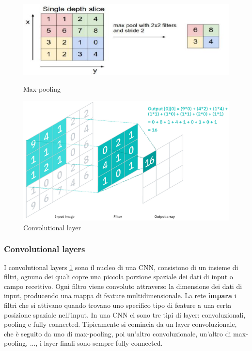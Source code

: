 \begin{figure}
	\centering
	\begin{minipage}{.5\textwidth}
		\centering
		\includegraphics[width=0.8\linewidth]{imgs/chapter11/img12}
		\caption{Max-pooling}
		\label{fig:chapter11-12}		
	\end{minipage}%
	\begin{minipage}{.5\textwidth}
		\centering
		\includegraphics[width=0.8\linewidth]{imgs/chapter11/img18}
		\caption{Convolutional layer}
		\label{fig:chapter11-18}
	\end{minipage}
\end{figure}

		\subsubsection{Convolutional layers}
		I convolutional layers \ref{fig:chapter11-18} sono il nucleo di una CNN, consistono di un insieme di filtri, ognuno dei quali copre una piccola porzione spaziale dei dati di input o campo recettivo.
		Ogni filtro viene convoluto attraverso la dimensione dei dati di input, producendo una mappa di feature multidimensionale.
		La rete \textbf{impara} i filtri che si attivano quando trovano uno specifico tipo di feature a una certa posizione spaziale nell'input. In una CNN ci sono tre tipi di layer: convoluzionali, pooling e fully connected. Tipicamente si comincia da un layer convoluzionale, che \`e seguito da uno di max-pooling, poi un'altro convoluzionale, un'altro di max-pooling, ..., i layer finali sono sempre fully-connected.
	
